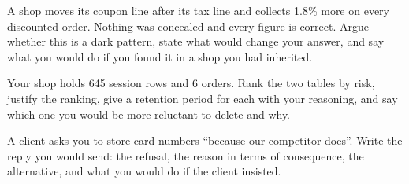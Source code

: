 \begin{checkpoint}
\begin{tightnum}
  \item A shop moves its coupon line after its tax line and collects 1.8\% more
        on every discounted order. Nothing was concealed and every figure is
        correct. Argue whether this is a dark pattern, state what would change
        your answer, and say what you would do if you found it in a shop you
        had inherited.
  \item Your shop holds 645 session rows and 6 orders. Rank the two tables by
        risk, justify the ranking, give a retention period for each with your
        reasoning, and say which one you would be more reluctant to delete and
        why.
  \item A client asks you to store card numbers ``because our competitor
        does''. Write the reply you would send: the refusal, the reason in
        terms of consequence, the alternative, and what you would do if the
        client insisted.
\end{tightnum}
\end{checkpoint}

